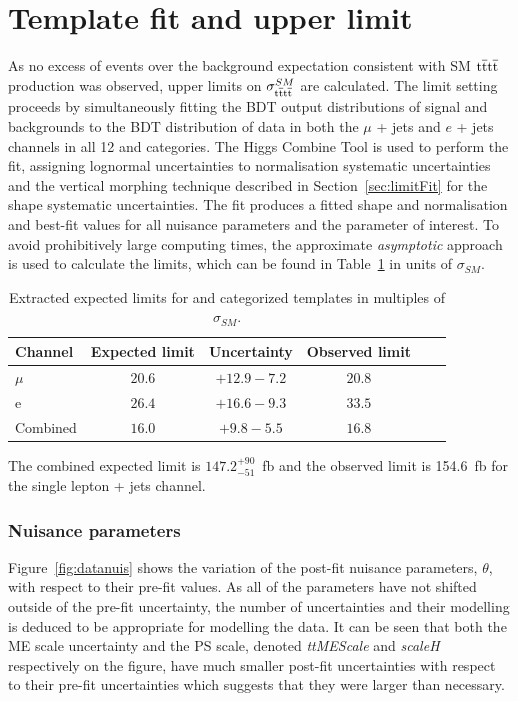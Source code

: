 \section{Template fit and upper limit}
\label{sec:limit13}
As no excess of events over the background expectation consistent with SM $\mathrm{t}\overline{\mathrm{t}}\mathrm{t}\overline{\mathrm{t}}$ production was observed, upper limits on $\sigma_{\mathrm{t}\overline{\mathrm{t}}\mathrm{t}\overline{\mathrm{t}}}^{SM}$ are calculated. 
The limit setting proceeds by simultaneously fitting the BDT output distributions of signal and backgrounds to the BDT distribution of data in both the $\mu$ + jets and $e$ + jets channels in all 12 \njets and \nMtags categories. The Higgs Combine Tool is used to perform the fit, assigning lognormal uncertainties to normalisation systematic uncertainties and the vertical morphing technique described in Section~\ref{sec:limitFit} for the shape systematic uncertainties. The fit produces a fitted shape and normalisation and best-fit values for all nuisance parameters and the parameter of interest. 
To avoid prohibitively large computing times, the approximate \emph{asymptotic} approach is used to calculate the \CLS limits, which can be found in Table~\ref{tab:limits} in units of $\sigma_{SM}$. 

\begin{table}[ht!]
\centering
\begin{tabular}{| l | c | c | c | c | c |}
  \hline
Channel  & Expected limit & Uncertainty & Observed limit\\
 \hline
$\mu$  &$20.6$ & $+12.9 -7.2$ & $20.8$ \\
 \hline
e  &  $26.4$ & $+16.6 -9.3$ & $33.5$ \\
 \hline
 Combined  &  $16.0$ & $+9.8 -5.5$ & $16.8$ \\
 \hline
\end{tabular}
 \caption{Extracted expected limits for \njets and \nMtags categorized templates in multiples of $\sigma_{SM}$.}
  \label{tab:limits}
  \end{table}

The combined expected limit is $147.2^{+90}_{-51}$~fb and the observed limit is 154.6~fb for the single lepton + jets channel.

\subsubsection{Nuisance parameters}

Figure~\ref{fig:datanuis} shows the variation of the post-fit nuisance parameters, $\theta$, with respect to their pre-fit values. As all of the parameters have not shifted outside of the pre-fit uncertainty, the number of uncertainties and their modelling is deduced to be appropriate for modelling the data. It can be seen that both the \ttbar ME scale uncertainty and the PS scale, denoted \emph{ttMEScale} and \emph{scaleH} respectively on the figure, have much smaller post-fit uncertainties with respect to their pre-fit uncertainties which suggests that they were larger than necessary.

